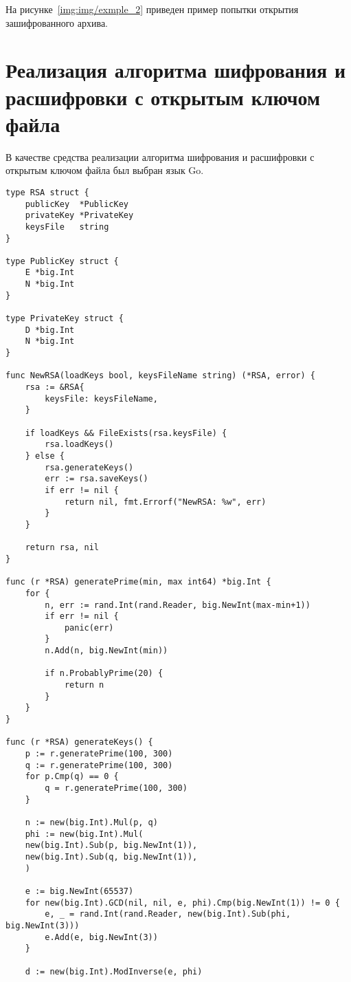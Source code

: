 \clearpage
На рисунке~\ref{img:img/exmple_2} приведен пример попытки открытия зашифрованного архива.

\FloatBarrier
{}
\FloatBarrier

\chapter{Реализация алгоритма шифрования и расшифровки с открытым ключом файла}
В качестве средства реализации алгоритма шифрования и расшифровки с открытым ключом файла был выбран язык Go.

\begin{lstlisting}[style=golang, caption={Реализация алгоритма шифрования и расшифровки с открытым ключом файла}, label=lst:codegolang]
type RSA struct {
	publicKey  *PublicKey
	privateKey *PrivateKey
	keysFile   string
}

type PublicKey struct {
	E *big.Int
	N *big.Int
}

type PrivateKey struct {
	D *big.Int
	N *big.Int
}

func NewRSA(loadKeys bool, keysFileName string) (*RSA, error) {
	rsa := &RSA{
		keysFile: keysFileName,
	}
	
	if loadKeys && FileExists(rsa.keysFile) {
		rsa.loadKeys()
	} else {
		rsa.generateKeys()
		err := rsa.saveKeys()
		if err != nil {
			return nil, fmt.Errorf("NewRSA: %w", err)
		}
	}
	
	return rsa, nil
}

func (r *RSA) generatePrime(min, max int64) *big.Int {
	for {
		n, err := rand.Int(rand.Reader, big.NewInt(max-min+1))
		if err != nil {
			panic(err)
		}
		n.Add(n, big.NewInt(min))
		
		if n.ProbablyPrime(20) {
			return n
		}
	}
}

func (r *RSA) generateKeys() {
	p := r.generatePrime(100, 300)
	q := r.generatePrime(100, 300)
	for p.Cmp(q) == 0 {
		q = r.generatePrime(100, 300)
	}
	
	n := new(big.Int).Mul(p, q)
	phi := new(big.Int).Mul(
	new(big.Int).Sub(p, big.NewInt(1)),
	new(big.Int).Sub(q, big.NewInt(1)),
	)
	
	e := big.NewInt(65537)
	for new(big.Int).GCD(nil, nil, e, phi).Cmp(big.NewInt(1)) != 0 {
		e, _ = rand.Int(rand.Reader, new(big.Int).Sub(phi, big.NewInt(3)))
		e.Add(e, big.NewInt(3))
	}
	
	d := new(big.Int).ModInverse(e, phi)
	

\end{lstlisting}
